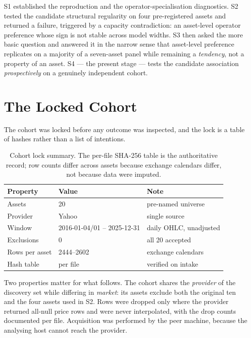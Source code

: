 \documentclass[conference]{IEEEtran}
\begin{document}
S1 established the reproduction and the operator-specialisation diagnostics. S2 tested the candidate
structural regularity on four pre-registered assets and returned a failure, triggered by a capacity
contradiction: an asset-level operator preference whose sign is not stable across model widths. S3
then asked the more basic question and answered it in the narrow sense that asset-level preference
replicates on a majority of a seven-asset panel while remaining a \emph{tendency}, not a property of
an asset. S4 --- the present stage --- tests the candidate association \emph{prospectively} on a
genuinely independent cohort.

\section{The Locked Cohort}
\label{sec:cohort}

The cohort was locked before any outcome was inspected, and the lock is a table of hashes rather than
a list of intentions.

\begin{table}[!t]
\centering
\footnotesize
\setlength{\tabcolsep}{3pt}
\begin{tabular}{@{}p{}p{}p{}@{}}
\toprule
Property & Value & Note \\
\midrule
Assets & 20 & pre-named universe \\
Provider & Yahoo & single source \\
Window & 2016-01-04/01 -- 2025-12-31 & daily OHLC, unadjusted \\
Exclusions & 0 & all 20 accepted \\
Rows per asset & 2444--2602 & exchange calendars \\
Hash table & per file & verified on intake \\
\bottomrule
\end{tabular}
\caption{Cohort lock summary. The per-file SHA-256 table is the authoritative record; row counts
differ across assets because exchange calendars differ, not because data were imputed.}
\label{tab:cohort}
\end{table}

Two properties matter for what follows. The cohort shares the \emph{provider} of the discovery set
while differing in \emph{market}: its assets exclude both the original ten and the four assets used in
S2. Rows were dropped only where the provider returned all-null price rows and were never
interpolated, with the drop counts documented per file. Acquisition was performed by the peer machine,
because the analysing host cannot reach the provider.
\end{document}
